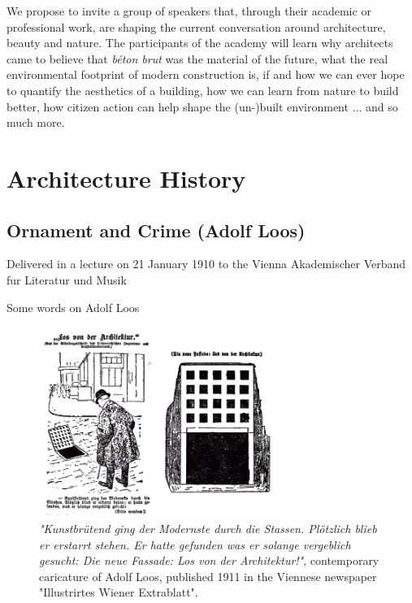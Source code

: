 \documentclass[a4paper]{article}
\begin{document}
We propose to invite a group of speakers that, through their academic or professional work, are shaping the current conversation around architecture, beauty and nature. The participants of the academy will learn why architects came to believe that \textit{béton brut} was the material of the future, what the real environmental footprint of modern construction is, if and how we can ever hope to quantify the aesthetics of a building, how we can learn from nature to build better, how citizen action can help shape the (un-)built environment $\dots$ and so much more.

\clearpage
\section{Architecture History}

\subsection{Ornament and Crime (Adolf Loos)}

Delivered in a lecture on 21 January 1910 to the Vienna Akademischer Verband fur Literatur und Musik

Some words on Adolf Loos

\begin{figure}[h]
  \centering
  \includegraphics[width=0.7\textwidth]{./figures/caricature_loos.jpg}
  \caption{\textit{"Kunstbrütend ging der Modernste durch die Stassen. Plötzlich blieb er erstarrt stehen. Er hatte gefunden was er solange vergeblich gesucht: Die neue Fassade: Los von der Architektur!"}, contemporary caricature of Adolf Loos, published 1911 in the Viennese newspaper "Illustrirtes Wiener Extrablatt".}
  \label{fig:caricature_loos}
\end{figure}
\end{document}
